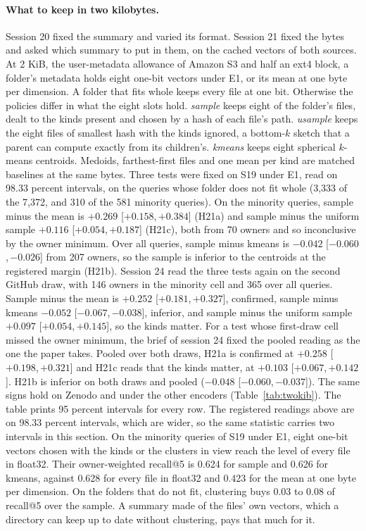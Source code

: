 \documentclass[11pt]{article}
\newcommand{\ci}[2]{[\ensuremath{#1},\,\ensuremath{#2}]}  %
\begin{document}
\paragraph{What to keep in two kilobytes.} Session 20 fixed the summary and varied its format. Session 21 fixed the bytes and asked which summary to put in them, on the cached vectors of both sources. At 2 KiB, the user-metadata allowance of Amazon S3 and half an ext4 block, a folder's metadata holds eight one-bit vectors under E1, or its mean at one byte per dimension. A folder that fits whole keeps every file at one bit. Otherwise the policies differ in what the eight slots hold. \emph{sample} keeps eight of the folder's files, dealt to the kinds present and chosen by a hash of each file's path. \emph{usample} keeps the eight files of smallest hash with the kinds ignored, a bottom-$k$ sketch \citep{cohen2007bottomk} that a parent can compute exactly from its children's. \emph{kmeans} keeps eight spherical $k$-means centroids. Medoids, farthest-first files and one mean per kind are matched baselines at the same bytes. Three tests were fixed on S19 under E1, read on 98.33 percent intervals, on the queries whose folder does not fit whole (3,333 of the 7,372, and 310 of the 581 minority queries). On the minority queries, sample minus the mean is $+0.269$ \ci{+0.158}{+0.384} (H21a) and sample minus the uniform sample $+0.116$ \ci{+0.054}{+0.187} (H21c), both from 70 owners and so inconclusive by the owner minimum. Over all queries, sample minus kmeans is $-0.042$ \ci{-0.060}{-0.026} from 207 owners, so the sample is inferior to the centroids at the registered margin (H21b).
Session 24 read the three tests again on the second GitHub draw, with 146 owners in the minority cell and 365 over all queries. Sample minus the mean is $+0.252$ \ci{+0.181}{+0.327}, confirmed, sample minus kmeans $-0.052$ \ci{-0.067}{-0.038}, inferior, and sample minus the uniform sample $+0.097$ \ci{+0.054}{+0.145}, so the kinds matter. For a test whose first-draw cell missed the owner minimum, the brief of session 24 fixed the pooled reading as the one the paper takes. Pooled over both draws, H21a is confirmed at $+0.258$ \ci{+0.198}{+0.321} and H21c reads that the kinds matter, at $+0.103$ \ci{+0.067}{+0.142}. H21b is inferior on both draws and pooled ($-0.048$ \ci{-0.060}{-0.037}).
The same signs hold on Zenodo and under the other encoders (Table~\ref{tab:twokib}). The table prints 95 percent intervals for every row. The registered readings above are on 98.33 percent intervals, which are wider, so the same statistic carries two intervals in this section. On the minority queries of S19 under E1, eight one-bit vectors chosen with the kinds or the clusters in view reach the level of every file in float32. Their owner-weighted recall@5 is 0.624 for sample and 0.626 for kmeans, against 0.628 for every file in float32 and 0.423 for the mean at one byte per dimension. On the folders that do not fit, clustering buys 0.03 to 0.08 of recall@5 over the sample. A summary made of the files' own vectors, which a directory can keep up to date without clustering, pays that much for it.
\end{document}
